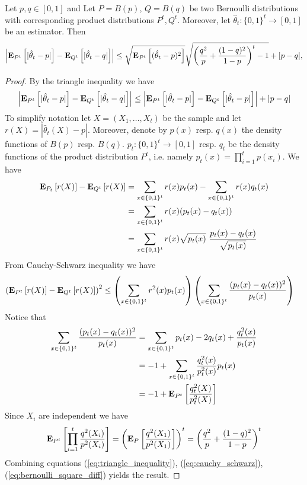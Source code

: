 \begin{lemma}\label{l:cauchy_schwarz}
  Let $p, q \in [0,1]$ and Let $P = B(p)$, $Q = B(q)$ be two Bernoulli
  distributions with corresponding product distributions $P^t, Q^t$.
  Moreover, let $\hat{\theta}_t: \{0,1\}^t \to [0,1]$ be an estimator.
  Then
  \[
    \left|
    \bm{\mathrm{E}}_{P^t} \left[ |\hat{\theta}_t-p | \right]
    - \bm{\mathrm{E}}_{Q^t} \left[ |\hat{\theta}_t-q | \right]
    \right|
    \leq
    \sqrt{\bm{\mathrm{E}}_{P^t} \left[ (\hat{\theta}_t-p)^2 \right]}
    \sqrt{ \left( \frac{q^2}{p} + \frac{(1-q)^2}{1-p} \right)^t - 1}
    + |p - q|,
  \]
\end{lemma}
\begin{proof}
  By the triangle inequality we have
  \begin{equation}\label{eq:triangle_inequality}
    \left|
    \bm{\mathrm{E}}_{P^t} \left[ |\hat{\theta}_t-p | \right] -
    \bm{\mathrm{E}}_{Q^t} \left[ |\hat{\theta}_t-q | \right]
    \right|
    \leq
    \left|
    \bm{\mathrm{E}}_{P^t} \left[ |\hat{\theta}_t-p | \right] -
    \bm{\mathrm{E}}_{Q^t} \left[ |\hat{\theta}_t-p | \right]
    \right|
    + |p - q|
  \end{equation}
  To simplify notation let $X = (X_1, \ldots, X_t)$ be the sample and let
  $r(X) = | \hat{\theta}_t(X)  - p |$. Moreover, denote
  by $p(x)$ resp. $q(x)$ the density functions of $B(p)$ resp. $B(q)$.
  $p_t: \{0,1\}^t \to [0,1]$ resp. $q_t$ be the density functions of
  the product distribution $P^t$, i.e.
  namely $p_t(x) = \prod_{i=1}^t p(x_i)$.
  We have
  \begin{align*}
    \bm{\mathrm{E}}_{P_t} \left[ r(X) \right] - \bm{\mathrm{E}}_{Q^t} \left[ r(X) \right]
    &=
    \sum_{x \in \{0,1\}^t} r(x) p_t(x) -
    \sum_{x \in \{0,1\}^t} r(x) q_t(x)
    \\
    &=
    \sum_{x \in \{0,1\}^t} r(x) (p_t(x) - q_t(x))  \\
    &=
    \sum_{x \in \{0,1\}^t} r(x) \sqrt{p_t(x)}\
    \frac{p_t(x) - q_t(x)}{\sqrt{p_t(x)}}
  \end{align*}
  From Cauchy-Schwarz inequality we have
  \begin{align}\label{eq:cauchy_schwarz}
    \left(\bm{\mathrm{E}}_{P^t} \left[ r(X) \right] - \bm{\mathrm{E}}_{Q^t} \left[ r(X) \right]\right)^2
    &\leq
    \left(
    \sum_{x \in \{0,1\}^t} r^2(x) p_t(x)
    \right)
    \left(
    \sum_{x \in \{0,1\}^t} \frac{(p_t(x) - q_t(x))^2}{p_t(x)}
    \right)
  \end{align}
  Notice that
  \begin{align*}
    \sum_{x \in \{0,1\}^t} \frac{(p_t(x) - q_t(x))^2}{p_t(x)}
    &=
    \sum_{x \in \{0,1\}^t} p_t(x) - 2 q_t(x) + \frac{q_t^2(x)}{p_t(x)}\\
    &=
    -1 + \sum_{x \in \{0,1\}^t} \frac{q_t^2(x)}{p_t^2(x)} p_t(x)\\
    &=
    -1 + \bm{\mathrm{E}}_{P^t} \left[ \frac{q_t^2(X)}{p_t^2(X)} \right]
  \end{align*}
  Since $X_i$ are independent we have
  \begin{equation}\label{eq:bernoulli_square_diff}
    \bm{\mathrm{E}}_{P^t} \left[ \prod_{i=1}^t\frac{ q^2(X_i)}{p^2(X_i)} \right]
    =
    \left(\bm{\mathrm{E}}_{P} \left[ \frac{ q^2(X_1)}{p^2(X_1)} \right]\right)^t
    = \left( \frac{q^2}{p} + \frac{(1-q)^2}{1-p} \right)^t
  \end{equation}
  Combining equations
  (\ref{eq:triangle_inequality}),
  (\ref{eq:cauchy_schwarz}),
  (\ref{eq:bernoulli_square_diff}) yields the result.
\end{proof}

